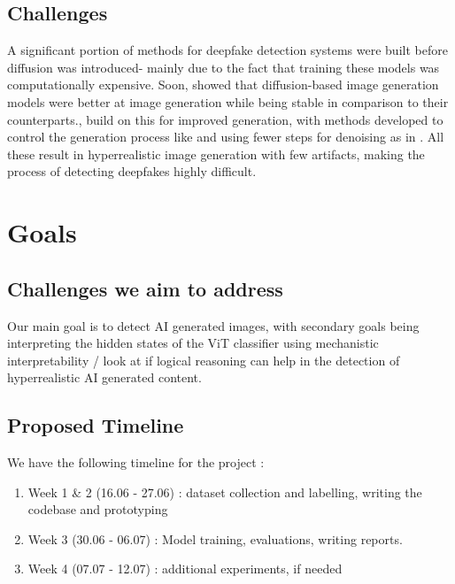 \documentclass[10pt,twocolumn,letterpaper]{article}
\begin{document}
\subsection{Challenges}
A significant portion of methods for deepfake detection systems were built before diffusion \cite{hoDenoisingDiffusionProbabilistic2020} was introduced- mainly due to the fact that training these models was computationally expensive. Soon, \cite{dhariwalDiffusionModelsBeat2021} showed that diffusion-based image generation models were better at image generation while being stable in comparison to their counterparts.\cite{rombachHighResolutionImageSynthesis2022}, \cite{lipmanFlowMatchingGenerative2023} build on this for improved generation, with methods developed to control the generation process like \cite{ruizDreamBoothFineTuning2023, zhangAddingConditionalControl2023} and using fewer steps for denoising as in \cite{lipmanFlowMatchingGenerative2023}. All these result in hyperrealistic image generation with few artifacts, making the process of detecting deepfakes highly difficult. 


\section{Goals}

\subsection{Challenges we aim to address}

Our main goal is to detect AI generated images, with secondary goals being interpreting the hidden states of the ViT classifier using mechanistic interpretability / look at if logical reasoning can help in the detection of hyperrealistic AI generated content.

\subsection{Proposed Timeline}
We have the following timeline for the project :
\begin{enumerate}
	\item Week 1 \& 2 (16.06 - 27.06) : dataset collection and labelling, writing the codebase and prototyping
	\item Week 3 (30.06 - 06.07) : Model training, evaluations, writing reports.
	\item Week 4 (07.07 - 12.07) : additional experiments, if needed
\end{enumerate}
\end{document}
